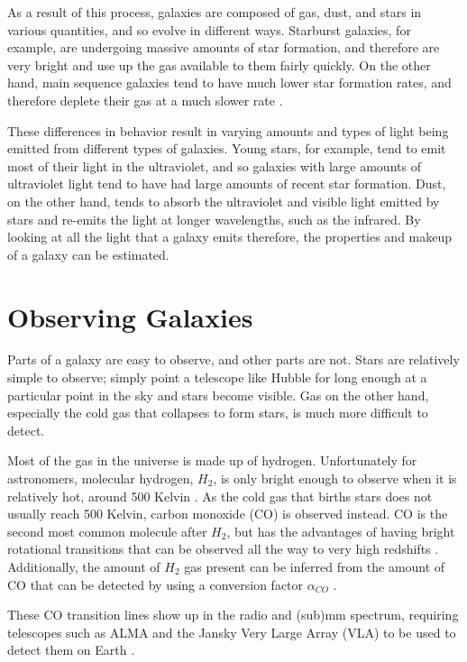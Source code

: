 \documentclass[twoside,single]{lion-msc}
\begin{document}
As a result of this process, galaxies are composed of gas, dust, and stars in various quantities, and so evolve in different ways. Starburst galaxies, for example, are undergoing massive amounts of star formation, and therefore are very bright and use up the gas available to them fairly quickly. On the other hand, main sequence galaxies tend to have much lower star formation rates, and therefore deplete their gas at a much slower rate \cite{scoville2017evolution, silverman2015higher}.

These differences in behavior result in varying amounts and types of light being emitted from different types of galaxies. Young stars, for example, tend to emit most of their light in the ultraviolet, and so galaxies with large amounts of ultraviolet light tend to have had large amounts of recent star formation. Dust, on the other hand, tends to absorb the ultraviolet and visible light emitted by stars and re-emits the light at longer wavelengths, such as the infrared. By looking at all the light that a galaxy emits therefore, the properties and makeup of a galaxy can be estimated.

\section{Observing Galaxies}

Parts of a galaxy are easy to observe, and other parts are not. Stars are relatively simple to observe; simply point a telescope like Hubble for long enough at a particular point in the sky and stars become visible. Gas on the other hand, especially the cold gas that collapses to form stars, is much more difficult to detect.

Most of the gas in the universe is made up of hydrogen. Unfortunately for astronomers, molecular hydrogen, $H_2$, is only bright enough to observe when it is relatively hot, around 500 Kelvin \cite{decarli2019alma}. As the cold gas that births stars does not usually reach 500 Kelvin, carbon monoxide (CO) is observed instead. CO is the second most common molecule after $H_2$, but has the advantages of having bright rotational transitions that can be observed all the way to very high redshifts \cite{walter2016alma, decarli2019alma}. Additionally, the amount of $H_2$ gas present can be inferred from the amount of CO that can be detected by using a conversion factor $\alpha_{CO}$ \cite{decarli2019alma}. 

These CO transition lines show up in the radio and (sub)mm spectrum, requiring telescopes such as ALMA and the Jansky Very Large Array (VLA) to be used to detect them on Earth \cite{decarli2019alma}. 
\end{document}
